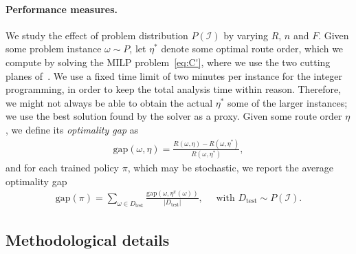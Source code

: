 \documentclass{report}
\theoremstyle{definition}
\theoremstyle{plain}
\begin{document}
\paragraph{Performance measures.}

We study the effect of problem distribution $P(\mathcal{I})$ by varying $R$,
$n$ and $F$.
%
Given some problem instance $\omega \sim P$, let $\eta^{*}$ denote some optimal
route order, which we compute by solving the MILP problem~\eqref{eq:C'}, where
we use the two cutting planes of~. We use a fixed time limit of
two minutes per instance for the integer programming, in order to keep the total
analysis time within reason. Therefore, we might not always be able to obtain
the actual $\eta^{*}$ some of the larger instances; we use the best solution
found by the solver as a proxy. Given some route order $\eta$, we define its
\textit{optimality gap} as
\begin{align*}
  \mathrm{gap}(\omega, \eta) = \frac{R(\omega, \eta) - R(\omega, \eta^*)}{R(\omega, \eta^{*})} ,
\end{align*}
and for each trained policy $\pi$, which may be stochastic, we report the
average optimality gap
\begin{align*}
  \mathrm{gap}(\pi) = \sum_{\omega \in D_\mathrm{test}} \frac{\mathrm{gap}(\omega, \eta^\pi(\omega))}{|D_\mathrm{test}|} , \quad \text{ with } D_\mathrm{test} \sim P(\mathcal{I}) .
\end{align*}

\subsection{Methodological details}
\end{document}
